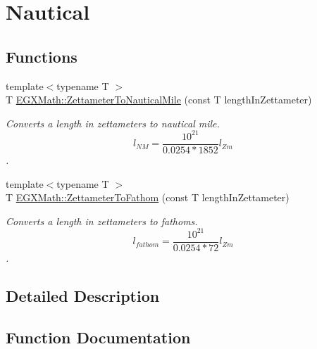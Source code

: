 \hypertarget{group___e_g_x_math-_conversions-_length_conversions-_s_i-_zettameter-_nautical}{}\section{Nautical}
\label{group___e_g_x_math-_conversions-_length_conversions-_s_i-_zettameter-_nautical}
\subsection*{Functions}
\begin{DoxyCompactItemize}
\item 
{\footnotesize template$<$typename T $>$ }\\T \mbox{\hyperlink{group___e_g_x_math-_conversions-_length_conversions-_s_i-_zettameter-_nautical_ga474eb2cb88740b3dd9e13fa6e8aa4558}{E\+G\+X\+Math\+::\+Zettameter\+To\+Nautical\+Mile}} (const T length\+In\+Zettameter)
\begin{DoxyCompactList}\small\item\em Converts a length in zettameters to nautical mile. \[ l_{NM}= \frac{10^{21}}{0.0254 * 1852} l_{Zm} \]. \end{DoxyCompactList}\item 
{\footnotesize template$<$typename T $>$ }\\T \mbox{\hyperlink{group___e_g_x_math-_conversions-_length_conversions-_s_i-_zettameter-_nautical_ga44aa79d0db3ed37a2e2f4800467008c2}{E\+G\+X\+Math\+::\+Zettameter\+To\+Fathom}} (const T length\+In\+Zettameter)
\begin{DoxyCompactList}\small\item\em Converts a length in zettameters to fathoms. \[ l_{fathom}= \frac{10^{21}}{0.0254 * 72} l_{Zm} \]. \end{DoxyCompactList}\end{DoxyCompactItemize}


\subsection{Detailed Description}


\subsection{Function Documentation}
\mbox{\label{group___e_g_x_math-_conversions-_length_conversions-_s_i-_zettameter-_nautical_ga44aa79d0db3ed37a2e2f4800467008c2}} 

